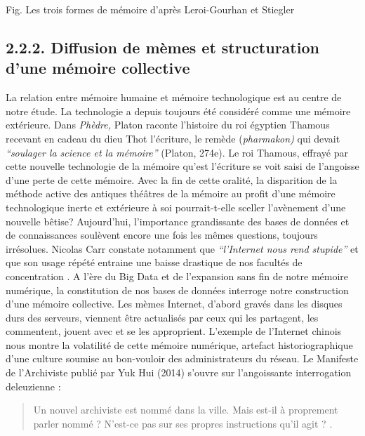 Fig. Les trois formes de m\'emoire d{\textquoteright}apr\`es
Leroi-Gourhan et Stiegler

\subsection[Diffusion de m\`emes et structuration d{\textquoteright}une m\'emoire collective]{2.2.2. Diffusion de m\`emes et structuration d{\textquoteright}une m\'emoire collective}
La relation entre m\'emoire humaine et m\'emoire technologique est au centre de notre \'etude. La technologie a depuis toujours \'et\'e consid\'er\'e comme une m\'emoire ext\'erieure. Dans \textit{Ph\`edre, }Platon raconte l{\textquoteright}histoire du roi \'egyptien Thamous recevant en cadeau du dieu Thot l{\textquoteright}\'ecriture, le rem\`ede (\textit{pharmakon) }qui devait \textit{{\textquotedblleft}soulager la science et la m\'emoire{\textquotedblright} }(Platon, 274e). Le roi Thamous, effray\'e par cette nouvelle technologie de la m\'emoire qu{\textquoteright}est l{\textquoteright}\'ecriture se voit saisi de l{\textquoteright}angoisse d{\textquoteright}une perte de cette m\'emoire. Avec la fin de cette oralit\'e, la disparition de la m\'ethode active des antiques th\'e\^atres de la m\'emoire au profit d{\textquoteright}une m\'emoire technologique inerte et ext\'erieure \`a soi pourrait-t-elle sceller l{\textquoteright}av\`enement d{\textquoteright}une nouvelle b\^etise? Aujourd{\textquoteright}hui, l{\textquoteright}importance grandissante des bases de donn\'ees et de connaissances soul\`event encore une fois les m\^emes questions, toujours irr\'esolues. Nicolas Carr constate notamment que \textit{{\textquotedblleft}l{\textquoteright}Internet nous rend stupide{\textquotedblright}} et que son usage r\'ep\'et\'e entraine une baisse drastique de nos facult\'es de concentration \citep{Carr2010}. A l{\textquoteright}\`ere du Big Data et de l{\textquoteright}expansion sans fin de notre m\'emoire num\'erique, la constitution de nos bases de donn\'ees interroge notre construction d{\textquoteright}une m\'emoire collective. Les m\`emes Internet, d{\textquoteright}abord grav\'es dans les disques durs des serveurs, viennent \^etre actualis\'es par ceux qui les partagent, les commentent, jouent avec et se les approprient. L{\textquoteright}exemple de l{\textquoteright}Internet chinois nous montre la volatilit\'e de cette m\'emoire num\'erique, artefact historiographique d{\textquoteright}une culture soumise au bon-vouloir des administrateurs du r\'eseau. Le Manifeste de l{\textquoteright}Archiviste publi\'e par Yuk Hui (2014) s{\textquoteright}ouvre sur l{\textquoteright}angoissante interrogation deleuzienne :  \begin{quote}
Un nouvel archiviste est nomm\'e dans la ville. Mais est-il \`a proprement parler nomm\'e ?
N'est-ce pas sur ses propres instructions qu'il agit ? 
\citep{Deleuze1984}.
\end{quote}

